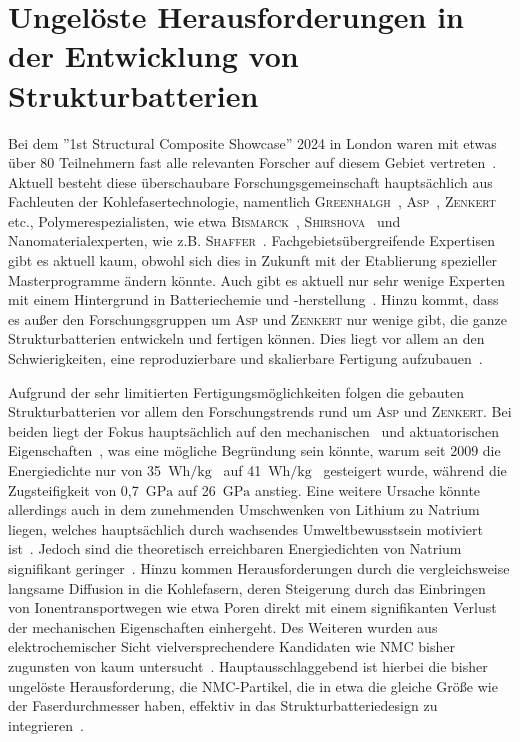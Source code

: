 \section{Ungelöste Herausforderungen in der Entwicklung von Strukturbatterien}
Bei dem ''1st Structural Composite Showcase'' 2024 in London waren mit etwas über 80 Teilnehmern fast alle relevanten Forscher auf diesem Gebiet vertreten~\cite{Greenhalgh2024}. Aktuell besteht diese überschaubare Forschungsgemeinschaft hauptsächlich aus Fachleuten der Kohlefasertechnologie, namentlich \textsc{Greenhalgh}~\cite{Greenhalgh2023}, \textsc{Asp}~\cite{Asp2019,Asp2021}, \textsc{Zenkert}~\cite{Zenkert2024} etc., Polymerespezialisten, wie etwa \textsc{Bismarck}~\cite{Bismarck2012}, \textsc{Shirshova}~\cite{Shirshova2013} und Nanomaterialexperten, wie z.B. \textsc{Shaffer}~\cite{Senokos2023}. Fachgebietsübergreifende Expertisen gibt es aktuell kaum, obwohl sich dies in Zukunft mit der Etablierung spezieller Masterprogramme ändern könnte. Auch gibt es aktuell nur sehr wenige Experten mit einem Hintergrund in Batteriechemie und -herstellung~\cite{Asp2013US}. Hinzu kommt, dass es außer den Forschungsgruppen um \textsc{Asp} und \textsc{Zenkert} nur wenige gibt, die ganze Strukturbatterien entwickeln und fertigen können. Dies liegt vor allem an den Schwierigkeiten, eine reproduzierbare und skalierbare Fertigung aufzubauen~\cite{Siraj2023}.

Aufgrund der sehr limitierten Fertigungsmöglichkeiten folgen die gebauten Strukturbatterien vor allem den Forschungstrends rund um \textsc{Asp} und \textsc{Zenkert}. Bei beiden liegt der Fokus hauptsächlich auf den mechanischen~\cite{Carlstedt2019a,Asp2021,Duan2021} und aktuatorischen Eigenschaften~\cite{Carlstedt2023}, was eine mögliche Begründung sein könnte, warum seit 2009 die Energiedichte nur von 35~$\si{\watt \hour \per \kg}$~\cite{Liu2009} auf 41~$\si{\watt \hour \per \kg}$~\cite{Siraj2023} gesteigert wurde, während die Zugsteifigkeit von 0,7~$\si{\GPa}$ auf 26~$\si{\GPa}$ anstieg. Eine weitere Ursache könnte allerdings auch in dem zunehmenden Umschwenken von Lithium zu Natrium liegen, welches hauptsächlich durch wachsendes Umweltbewusstsein motiviert ist~\cite{Peters2022}. Jedoch sind die theoretisch erreichbaren Energiedichten von Natrium signifikant geringer~\cite{Kundu2015}. Hinzu kommen Herausforderungen durch die vergleichsweise langsame Diffusion in die Kohlefasern, deren Steigerung durch das Einbringen von Ionentransportwegen wie etwa Poren direkt mit einem signifikanten Verlust der mechanischen Eigenschaften einhergeht. Des Weiteren wurden aus elektrochemischer Sicht vielversprechendere Kandidaten wie NMC bisher zugunsten von  kaum untersucht~\cite{Asp2024}. Hauptausschlaggebend ist hierbei die bisher ungelöste Herausforderung, die NMC-Partikel, die in etwa die gleiche Größe wie der Faserdurchmesser haben, effektiv in das Strukturbatteriedesign zu integrieren~\cite{Asp2014}.


